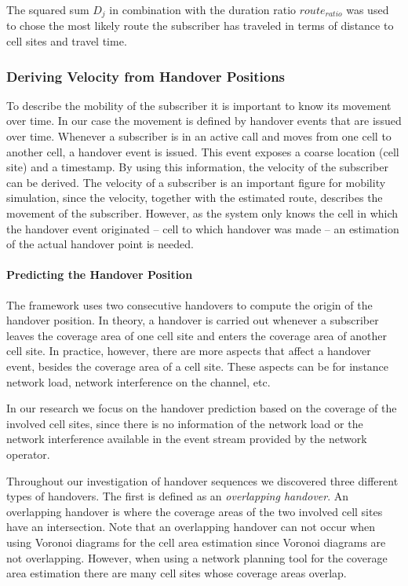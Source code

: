 \documentclass[twocolumn]{bmcart}%
\begin{document}
The squared sum $D_j$ in combination with the duration ratio $route_{ratio}$ was used to chose the most likely route the subscriber has traveled in terms of distance to cell sites and travel time.
\subsubsection*{Deriving Velocity from Handover Positions}
To describe the mobility of the subscriber it is important to know its movement over time. In our case the movement is defined by handover events that are issued over time. Whenever a subscriber is in an active call and moves from one cell to another cell, a handover event is issued. This event exposes a coarse location (cell site) and a timestamp. By using this information, the velocity of the subscriber can be derived. The velocity of a subscriber is an important figure for mobility simulation, since the velocity, together with the estimated route, describes the movement of the subscriber. However, as the system only knows the cell in which the handover event originated -- cell to which handover was made -- an estimation of the actual handover point is needed.
\paragraph{Predicting the Handover Position}
The framework uses two consecutive handovers to compute the origin of the handover position. In theory, a handover is carried out whenever a subscriber leaves the coverage area of one cell site and enters the coverage area of another cell site. In practice, however, there are more aspects that affect a handover event, besides the coverage area of a cell site. These aspects can be for instance network load, network interference on the channel, etc.

In our research we focus on the handover prediction based on the coverage of the involved cell sites, since there is no information of the network load or the network interference available in the event stream provided by the network operator.

Throughout our investigation of handover sequences we discovered three different types of handovers. The first is defined as an \emph{overlapping handover}. 
An overlapping handover is where the coverage areas of the two involved cell sites have an intersection. Note that an overlapping handover can not occur when using Voronoi diagrams for the cell area estimation since Voronoi diagrams are not overlapping. However, when using a network planning tool for the coverage area estimation there are many cell sites whose coverage areas overlap. 
\end{document}
